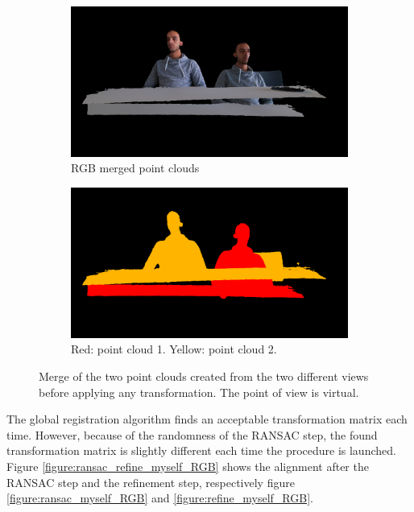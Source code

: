 \begin{figure}[H]
\centering
  \begin{subfigure}[b]{0.48 \textwidth}
    \includegraphics[width=\textwidth]{images/registration/raw_myself_RGB.png}
    \caption{RGB merged point clouds}
    \label{figure:raw_myself_RGB}
  \end{subfigure}
  \hfill
  \begin{subfigure}[b]{0.48 \textwidth}
    \includegraphics[width=\textwidth]{images/registration/raw_myself_colored.png}
    \caption{Red: point cloud 1. Yellow: point cloud 2.}
    \label{figure:raw_myself_colored}
  \end{subfigure}
  \caption{Merge of the two point clouds created from the two different views before applying any transformation. The point of view is virtual.}
  \label{figure:raw_myself}
\end{figure}

The global registration algorithm finds an acceptable transformation matrix each time. However, because of the randomness of the RANSAC step, the found transformation matrix is slightly different each time the procedure is launched. Figure \ref{figure:ransac_refine_myself_RGB} shows the alignment after the RANSAC step and the refinement step, respectively figure \ref{figure:ransac_myself_RGB} and \ref{figure:refine_myself_RGB}.

